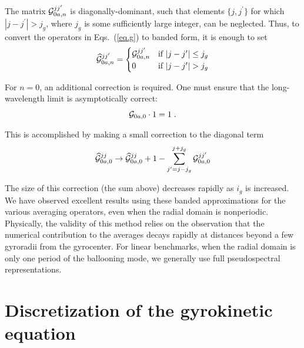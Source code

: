 The matrix ${\cal G}_{0a,n}^{jj^\prime}$ is diagonally-dominant, such 
that elements $\{j,j^\prime\}$ for which $|j-j^\prime| > j_g$, 
where $j_g$ is some sufficiently large integer, can be neglected.  
Thus, to convert the operators in Eqs.~(\ref{eq.g}) to banded 
form, it is enough to set
%
\begin{equation}
{\widehat {{\cal G}}}_{0a,n}^{jj^\prime} = 
\begin{cases}
{\cal G}_{0a,n}^{jj^\prime} & \text{if $|j-j^\prime| \le j_g$}   \\
0 &  \text{if $|j-j^\prime| > j_g$}
\end{cases}
\end{equation}

\noindent
For $n=0$, an additional correction is required.  One must ensure 
that the long-wavelength limit is asymptotically correct:
%
\begin{equation}
{\cal G}_{0a,0} \cdot 1 = 1 \; .
\end{equation}

\noindent
This is accomplished by making a small correction to the diagonal 
term
%
\begin{equation}
{\widehat {{\cal G}}}_{0a,0}^{jj} \rightarrow 
 {\widehat{{\cal G}}}_{0a,0}^{jj} + 1 
- \sum_{j^\prime=j-j_g}^{j+j_g} {\cal G}_{0a,0}^{jj^\prime} 
\end{equation}

\noindent
The size of this correction (the sum above) decreases rapidly 
as $i_g$ is increased.  We have observed excellent results using 
these banded approximations for the various averaging operators, 
even when the radial domain is nonperiodic.  Physically, the validity 
of this method relies on the observation that the numerical 
contribution to the averages decays rapidly at distances beyond 
a few gyroradii from the gyrocenter.  For linear benchmarks, when 
the radial domain is only one period of the ballooning mode, we 
generally use full pseudospectral representations.

\section{Discretization of the gyrokinetic equation}

